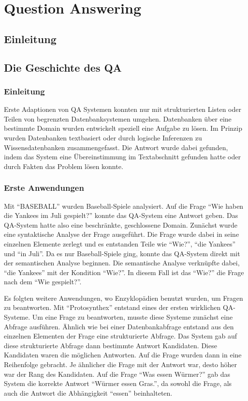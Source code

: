 \documentclass[
        ngerman,
        paper=a4,
        numbers=noendperiod,
]{scrreprt}
\begin{document}
\chapter{Question Answering}

\section{Einleitung} %
\section{Die Geschichte des QA} %
\subsection{Einleitung}
Erste Adaptionen von QA Systemen konnten nur mit strukturierten Listen oder Teilen von begrenzten Datenbanksystemen umgehen. Datenbanken über eine bestimmte Domain wurden entwickelt speziell eine Aufgabe zu lösen. Im Prinzip wurden Datenbanken textbasiert oder durch logische Inferenzen zu Wissensdatenbanken zusammengefasst. Die Antwort wurde dabei gefunden, indem das System eine Übereinstimmung im Textabschnitt gefunden hatte oder durch Fakten das Problem lösen konnte.
\subsection{Erste Anwendungen}
Mit \enquote{BASEBALL}  \citep{Green1961Baseball:Question-answerer} wurden Baseball-Spiele analysiert.  Auf die Frage \enquote{Wie haben die Yankees im Juli gespielt?} konnte das QA-System eine Antwort geben. Das QA-System hatte also eine beschränkte, geschlossene Domain. Zunächst wurde eine syntaktische Analyse der Frage ausgeführt. Die Frage wurde dabei in seine einzelnen Elemente zerlegt und es entstanden Teile wie \enquote{Wie?}, \enquote{die Yankees} und \enquote{in Juli}. Da es nur Baseball-Spiele ging, konnte das QA-System direkt mit der semantischen Analyse beginnen. Die semantische Analyse verknüpfte dabei, \enquote{die Yankees} mit der Kondition \enquote{Wie?}. In diesem Fall ist das \enquote{Wie?} die Frage nach dem \enquote{Wie gespielt?}.

Es folgten weitere Anwendungen, wo Enzyklopädien benutzt wurden, um Fragen zu beantworten. Mit \enquote{Protosynthex}\citep{Simmons1964IndexingQuestions} entstand eines der ersten wirklichen QA-Systeme. Um eine Frage zu beantworten, musste diese Systeme zunächst eine Abfrage ausführen. Ähnlich wie bei einer Datenbankabfrage entstand aus den einzelnen Elementen der Frage eine strukturierte Abfrage. Das System gab auf diese strukturierte Abfrage dann bestimmte Antwort Kandidaten. Diese Kandidaten waren die möglichen Antworten. Auf die Frage wurden dann in eine Reihenfolge gebracht. Je ähnlicher die Frage mit der Antwort war, desto höher war der Rang des Kandidaten. Auf die Frage \enquote{Was essen Würmer?} gab das System die korrekte Antwort \enquote{Würmer essen Gras.}, da sowohl die Frage, als auch die Antwort die Abhängigkeit \enquote{essen} beinhalteten. 
\end{document}
